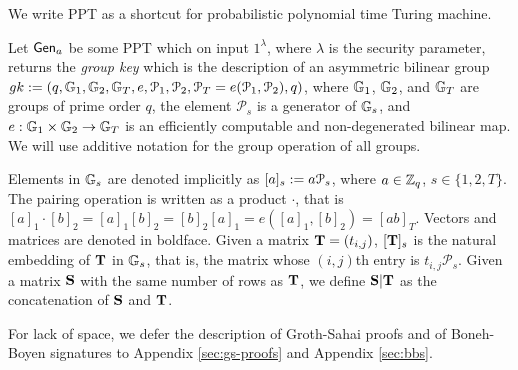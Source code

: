 
We write PPT as a shortcut for probabilistic polynomial time Turing machine.

Let $\mathsf{Gen}_a$ be some PPT which on input $1^{\lambda}$, where $\lambda$ is the security parameter, returns the \emph{group key} which is the description of an asymmetric bilinear group $gk:=(q,\mathbb{G}_1,\mathbb{G}_2,\mathbb{G}_T,e,\mathcal{P}_1,\mathcal{P}_2,\mathcal{P}_T=e(\mathcal{P}_1,\mathcal{P}_2),q)$, where $\mathbb{G}_1$, $\mathbb{G}_2$,
and $\mathbb{G}_T$ are groups of prime order $q$, the element $\mathcal{P}_s$ is a generator of 
$\mathbb{G}_s$, and $e:\mathbb{G}_1\times\mathbb{G}_2\to\mathbb{G}_T$ is an efficiently computable and non-degenerated bilinear map. We will use additive notation for the group operation of all groups.

Elements in $\mathbb{G}_s$ are denoted implicitly as $[a]_s:=a \mathcal{P}_s$, where $a\in\mathbb{Z}_q$, $s\in\{1,2,T\}$. 
The pairing operation is written as a product $\cdot$, that is $[a]_1 \cdot [b]_2 = [a]_1 [b]_2= [b]_2[a]_1=e([a]_1,[b]_2)=[ab]_T$. Vectors and matrices are denoted in boldface. Given a matrix $\mathbf{{T}}=(t_{i,j})$, $[\mathbf{{T}}]_s$ is
the natural embedding of $\mathbf{{T}}$ in $\mathbb{G}_s$, that is, the matrix whose $(i,j)$th entry is $t_{i,j}\mathcal{P}_s$. Given a matrix $\mathbf{{S}}$ with the same number of rows as $\mathbf{{T}}$, we define $\mathbf{{S}}|\mathbf{{T}}$ as the concatenation of $\mathbf{{S}}$ and $\mathbf{{T}}$.

For lack of space, we defer the description of Groth-Sahai proofs and of Boneh-Boyen signatures to Appendix \ref{sec:gs-proofs} and Appendix \ref{sec:bbs}.